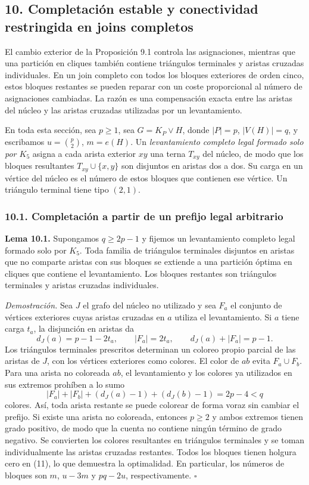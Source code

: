 \documentclass[spanish,11pt,a4paper]{article}
\begin{document}
\subsection{10. Completación estable y conectividad restringida en joins
completos}\label{completaciuxf3n-estable-y-conectividad-restringida-en-joins-completos}

El cambio exterior de la Proposición 9.1 controla las asignaciones,
mientras que una partición en cliques también contiene triángulos
terminales y aristas cruzadas individuales. En un join completo con
todos los bloques exteriores de orden cinco, estos bloques restantes se
pueden reparar con un coste proporcional al número de asignaciones
cambiadas. La razón es una compensación exacta entre las aristas del
núcleo y las aristas cruzadas utilizadas por un levantamiento.

En toda esta sección, sea \(p\ge1\), sea \(G=K_P\vee H\), donde
\(|P|=p\), \(|V(H)|=q\), y escribamos \(u=\binom p2\), \(m=e(H)\). Un
\emph{levantamiento completo legal formado solo por \(K_5\)} asigna a
cada arista exterior \(xy\) una terna \(T_{xy}\) del núcleo, de modo que
los bloques resultantes \(T_{xy}\cup\{x,y\}\) son disjuntos en aristas
dos a dos. Su carga en un vértice del núcleo es el número de estos
bloques que contienen ese vértice. Un triángulo terminal tiene tipo
\((2,1)\).

\subsubsection{10.1. Completación a partir de un prefijo legal
arbitrario}\label{completaciuxf3n-a-partir-de-un-prefijo-legal-arbitrario}

\textbf{Lema 10.1.} Supongamos \(q\ge2p-1\) y fijemos un levantamiento
completo legal formado solo por \(K_5\). Toda familia de triángulos
terminales disjuntos en aristas que no comparte aristas con sus bloques
se extiende a una partición óptima en cliques que contiene el
levantamiento. Los bloques restantes son triángulos terminales y aristas
cruzadas individuales.

\emph{Demostración.} Sea \(J\) el grafo del núcleo no utilizado y sea
\(F_a\) el conjunto de vértices exteriores cuyas aristas cruzadas en
\(a\) utiliza el levantamiento. Si \(a\) tiene carga \(t_a\), la
disjunción en aristas da \[
d_J(a)=p-1-2t_a,\qquad |F_a|=2t_a,
\qquad d_J(a)+|F_a|=p-1.
\] Los triángulos terminales prescritos determinan un coloreo propio
parcial de las aristas de \(J\), con los vértices exteriores como
colores. El color de \(ab\) evita \(F_a\cup F_b\). Para una arista no
coloreada \(ab\), el levantamiento y los colores ya utilizados en sus
extremos prohíben a lo sumo \[
|F_a|+|F_b|+(d_J(a)-1)+(d_J(b)-1)=2p-4<q
\] colores. Así, toda arista restante se puede colorear de forma voraz
sin cambiar el prefijo. Si existe una arista no coloreada, entonces
\(p\ge2\) y ambos extremos tienen grado positivo, de modo que la cuenta
no contiene ningún término de grado negativo. Se convierten los colores
resultantes en triángulos terminales y se toman individualmente las
aristas cruzadas restantes. Todos los bloques tienen holgura cero en
(11), lo que demuestra la optimalidad. En particular, los números de
bloques son \(m\), \(u-3m\) y \(pq-2u\), respectivamente. \(\square\)
\end{document}
